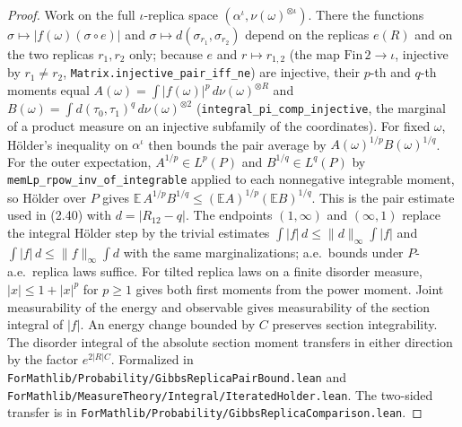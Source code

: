 \begin{proof}
  \leanok
Work on the full $\iota$-replica space $(\alpha^\iota,\nu(\omega)^{\otimes\iota})$. There the functions $\sigma\mapsto|f(\omega)(\sigma\circ e)|$ and $\sigma\mapsto d(\sigma_{r_1},\sigma_{r_2})$ depend on the replicas $e(R)$ and on the two replicas $r_1,r_2$ only; because $e$ and $r\mapsto r_{1,2}$ (the map $\mathrm{Fin}\,2\to\iota$, injective by $r_1\ne r_2$, \texttt{Matrix.injective\_pair\_iff\_ne}) are injective, their $p$-th and $q$-th moments equal
$A(\omega)=\int|f(\omega)|^p\,d\nu(\omega)^{\otimes R}$ and $B(\omega)=\int d(\tau_0,\tau_1)^q\,d\nu(\omega)^{\otimes2}$ (\texttt{integral\_pi\_comp\_injective}, the marginal of a product measure on an injective subfamily of the coordinates).
For fixed $\omega$, H\"older's inequality on $\alpha^\iota$ then bounds the pair average by $A(\omega)^{1/p}B(\omega)^{1/q}$. For the outer expectation, $A^{1/p}\in L^p(P)$ and $B^{1/q}\in L^q(P)$ by \texttt{memLp\_rpow\_inv\_of\_integrable}
applied to each nonnegative integrable moment,
so H\"older over $P$ gives $\mathbb E\,A^{1/p}B^{1/q}\le(\mathbb E A)^{1/p}(\mathbb E B)^{1/q}$. This is the pair estimate used in (2.40) with $d=|R_{12}-q|$.
The endpoints $(1,\infty)$ and $(\infty,1)$ replace the integral H\"older step by the trivial estimates $\int|f|\,d\le\|d\|_\infty\int|f|$ and $\int|f|\,d\le\|f\|_\infty\int d$ with the same marginalizations; a.e.\ bounds under $P$-a.e.\ replica laws suffice.
For tilted replica laws on a finite disorder measure, $|x|\le 1+|x|^p$ for $p\ge1$ gives both
first moments from the power moment. Joint measurability of the energy and observable gives
measurability of the section integral of $|f|$.
An energy change bounded by $C$ preserves section integrability. The disorder integral of
the absolute section moment transfers in either direction by the factor $e^{2|R|C}$.
Formalized in \texttt{ForMathlib/Probability/GibbsReplicaPairBound.lean} and
\texttt{ForMathlib/MeasureTheory/Integral/IteratedHolder.lean}. The two-sided transfer is in
\texttt{ForMathlib/Probability/GibbsReplicaComparison.lean}.
\end{proof}

